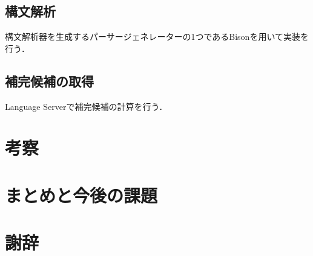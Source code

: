\documentclass[12pt,a4j]{jreport}
\begin{document}
\section{構文解析}
構文解析器を生成するパーサージェネレーターの1つであるBison\cite{bison}を用いて実装を行う．





\section{補完候補の取得}
Language Serverで補完候補の計算を行う\cite{lsp}．






\chapter{考察}




\chapter{まとめと今後の課題}










\chapter*{謝辞}


\newpage


\end{document}
